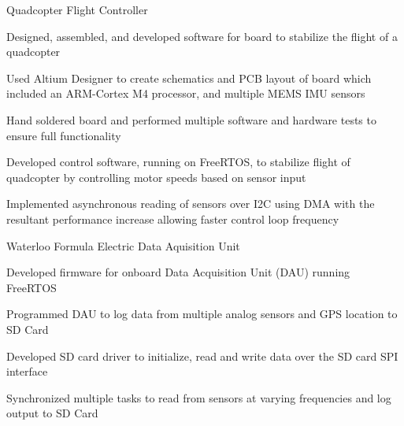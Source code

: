 

\begin{cventries}

  \cventry
    {Quadcopter Flight Controller} %
    {} %
    {} %
    {} %
    {
      \begin{cvitems} %
        \item {Designed, assembled, and developed software for board to stabilize the flight of a quadcopter}
        \item {Used Altium Designer to create schematics and PCB layout of board which included an ARM-Cortex M4 processor, and multiple MEMS IMU sensors}
        \item {Hand soldered board and performed multiple software and hardware tests to ensure full functionality}
        \item {Developed control software, running on FreeRTOS, to stabilize flight of quadcopter by controlling motor speeds based on sensor input}
        \item {Implemented asynchronous reading of sensors over I2C using DMA with the resultant performance increase allowing faster control loop frequency}
      \end{cvitems}
    }

  \cventry
    {Waterloo Formula Electric} %
    {Data Aquisition Unit} %
    {} %
    {} %
    {
      \begin{cvitems} %
        \item {Developed firmware for onboard Data Acquisition Unit (DAU) running FreeRTOS}
        \item {Programmed DAU to log data from multiple analog sensors and GPS location to SD Card}
        \item {Developed SD card driver to initialize, read and write data over the SD card SPI interface}
        \item {Synchronized multiple tasks to read from sensors at varying frequencies and log output to SD Card}
      \end{cvitems}
    }


\end{cventries}
